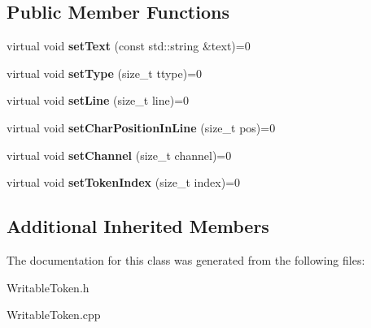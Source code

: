 \subsection*{Public Member Functions}
\begin{DoxyCompactItemize}
\item 
\mbox{\label{classantlr4_1_1WritableToken_a1a977f23d61ac21229bff268fe221fad}} 
virtual void {\bfseries set\+Text} (const std\+::string \&text)=0
\item 
\mbox{\label{classantlr4_1_1WritableToken_abc664d8972716e7480779f4c40e8e65f}} 
virtual void {\bfseries set\+Type} (size\+\_\+t ttype)=0
\item 
\mbox{\label{classantlr4_1_1WritableToken_a5d9ab9e05d2b1bdca5911115bf1b4e41}} 
virtual void {\bfseries set\+Line} (size\+\_\+t line)=0
\item 
\mbox{\label{classantlr4_1_1WritableToken_a32235ff97fecfbf248ac5ac2c13f3302}} 
virtual void {\bfseries set\+Char\+Position\+In\+Line} (size\+\_\+t pos)=0
\item 
\mbox{\label{classantlr4_1_1WritableToken_ab38295ef13056edb09233e94b747e65c}} 
virtual void {\bfseries set\+Channel} (size\+\_\+t channel)=0
\item 
\mbox{\label{classantlr4_1_1WritableToken_a6e70cfd73ff274b0b165431aa3142dae}} 
virtual void {\bfseries set\+Token\+Index} (size\+\_\+t index)=0
\end{DoxyCompactItemize}
\subsection*{Additional Inherited Members}


The documentation for this class was generated from the following files\+:\begin{DoxyCompactItemize}
\item 
Writable\+Token.\+h\item 
Writable\+Token.\+cpp\end{DoxyCompactItemize}
